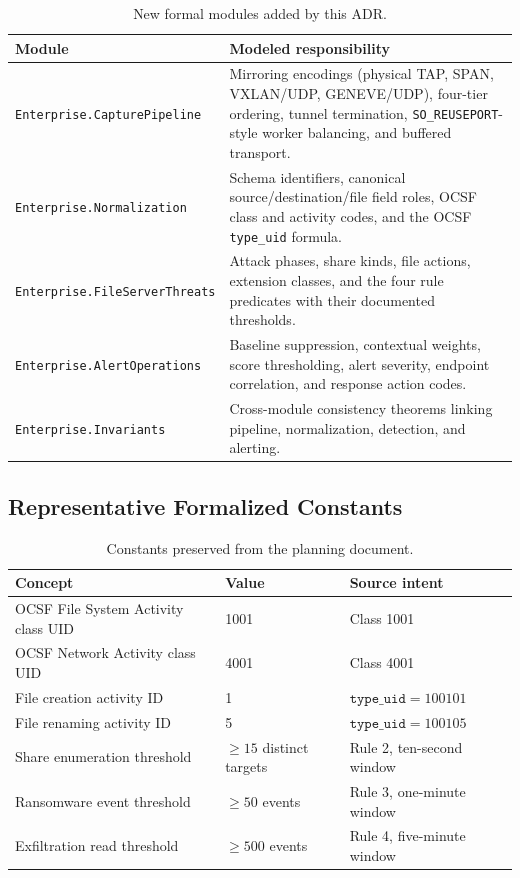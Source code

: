 \documentclass[11pt]{article}
\begin{document}
\begin{table}[htbp]
\centering
\small
\begin{tabularx}{\textwidth}{l X}
\toprule
\textbf{Module} & \textbf{Modeled responsibility} \\
\midrule
\texttt{Enterprise.CapturePipeline}
  & Mirroring encodings (physical TAP, SPAN, VXLAN/UDP, GENEVE/UDP), four-tier ordering, tunnel
    termination, \texttt{SO\_REUSEPORT}-style worker balancing, and buffered transport. \\
\texttt{Enterprise.Normalization}
  & Schema identifiers, canonical source/destination/file field roles, OCSF class and activity
    codes, and the OCSF \texttt{type\_uid} formula. \\
\texttt{Enterprise.FileServerThreats}
  & Attack phases, share kinds, file actions, extension classes, and the four rule predicates with
    their documented thresholds. \\
\texttt{Enterprise.AlertOperations}
  & Baseline suppression, contextual weights, score thresholding, alert severity, endpoint
    correlation, and response action codes. \\
\texttt{Enterprise.Invariants}
  & Cross-module consistency theorems linking pipeline, normalization, detection, and alerting. \\
\bottomrule
\end{tabularx}
\caption{New formal modules added by this ADR.}
\end{table}

\subsection{Representative Formalized Constants}

\begin{table}[htbp]
\centering
\small
\begin{tabular}{lll}
\toprule
\textbf{Concept} & \textbf{Value} & \textbf{Source intent} \\
\midrule
OCSF File System Activity class UID & 1001 & Class 1001 \\
OCSF Network Activity class UID & 4001 & Class 4001 \\
File creation activity ID & 1 & $\texttt{type\_uid}=100101$ \\
File renaming activity ID & 5 & $\texttt{type\_uid}=100105$ \\
Share enumeration threshold & $\geq 15$ distinct targets & Rule 2, ten-second window \\
Ransomware event threshold & $\geq 50$ events & Rule 3, one-minute window \\
Exfiltration read threshold & $\geq 500$ events & Rule 4, five-minute window \\
\bottomrule
\end{tabular}
\caption{Constants preserved from the planning document.}
\end{table}
\end{document}
